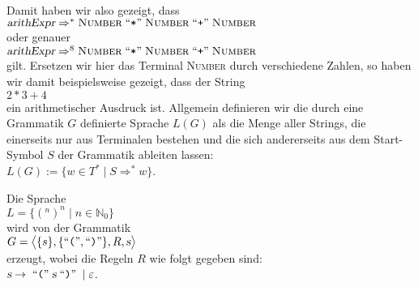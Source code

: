 Damit haben wir also gezeigt, dass
\\[0.2cm]
\hspace*{1.3cm}
$\textsl{arithExpr} \Rightarrow^* \textsc{Number} \;\mbox{``\texttt{*}''}\; \textsc{Number} \;\mbox{``\texttt{+}''}\; \textsc{Number}$
\\[0.2cm]
oder genauer
\\[0.2cm]
\hspace*{1.3cm}
$\textsl{arithExpr} \Rightarrow^8 \textsc{Number} \;\mbox{``\texttt{*}''}\; \textsc{Number} \;\mbox{``\texttt{+}''}\; \textsc{Number}$
\\[0.2cm]
gilt.  Ersetzen wir hier das Terminal \textsc{Number} durch verschiedene Zahlen, so haben wir damit
beispielsweise gezeigt, dass der String
\\[0.2cm]
\hspace*{1.3cm}
$2 * 3 + 4$
\\[0.2cm]
ein arithmetischer Ausdruck ist.  Allgemein definieren wir die durch eine Grammatik $G$ definierte
Sprache $L(G)$ als die Menge aller Strings, die einerseits nur aus Terminalen bestehen und die sich
andererseits aus dem Start-Symbol $S$ der Grammatik ableiten lassen:
\\[0.2cm]
\hspace*{1.3cm}
$L(G) := \bigl\{ w \in T^* \mid S \Rightarrow^* w \bigr\}$.


\example
Die Sprache
\\[0.2cm]
\hspace*{1.3cm}
$L = \{ (^n )^n \mid n \in \mathbb{N}_0 \}$ 
\\[0.2cm]
wird von der Grammatik 
\\[0.2cm]
\hspace*{1.3cm}
$G = \bigl\langle \{s\}, \{ \mbox{``\texttt{(}''}, \mbox{``\texttt{)}''} \}, R, \textsl{s} \bigr\rangle$
\\[0.2cm]
erzeugt, wobei die Regeln $R$ wie folgt gegeben sind:
\\[0.2cm]
\hspace*{1.3cm}
$\textsl{s} \rightarrow \;\mbox{``\texttt{(}''}\; \textsl{s} \;\mbox{``\texttt{)}''}\;  \mid  \varepsilon$.





